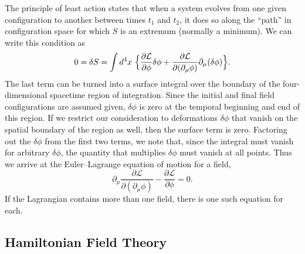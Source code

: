 The principle of least action states that when a system evolves from one
given configuration to another between times $t_1$ and $t_2$, it does so
along the ``path'' in configuration space for which $S$ is an extremum
(normally a minimum).  We can write this condition as
\begin{equation}
  0 = \delta S = \int d^4x\ \Bigl\{
    \frac{\partial\mathcal{L}}{\partial\phi}\delta\phi
    + \frac{\partial\mathcal{L}}{\partial(\partial_\mu\phi)}
      \partial_\mu(\delta\phi) \Bigr\}.
  \label{eq:2.2}
\end{equation}
The last term can be turned into a surface integral over the boundary of
the four-dimensional spacetime region of integration.  Since the initial
and final field configurations are assumed given, $\delta\phi$ is zero at
the temporal beginning and end of this region.  If we restrict our
consideration to deformations $\delta\phi$ that vanish on the spatial
boundary of the region as well, then the surface term is zero.  Factoring
out the $\delta\phi$ from the first two terms, we note that, since the
integral must vanish for arbitrary $\delta\phi$, the quantity that
multiplies $\delta\phi$ must vanish at all points.  Thus we arrive at the
Euler--Lagrange equation of motion for a field,
\begin{equation}
  \partial_\mu \frac{\partial\mathcal{L}}{\partial(\partial_\mu\phi)}
  - \frac{\partial\mathcal{L}}{\partial\phi} = 0 .
  \label{eq:2.3}
\end{equation}
If the Lagrangian contains more than one field, there is one such equation
for each.

\subsection*{Hamiltonian Field Theory}

